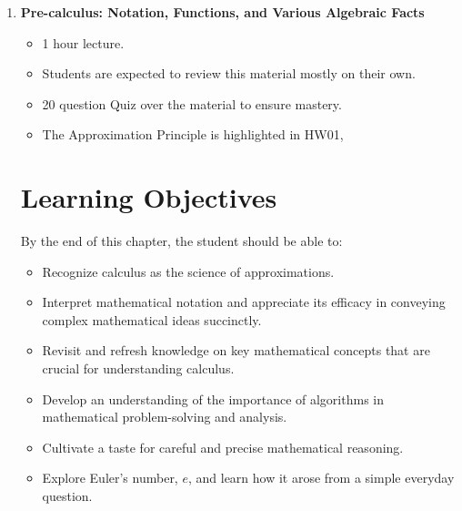 \documentclass[letterpaper]{book}
\begin{document}
\begin{enumerate}[label={\large\arabic*}, font=\large]
    
\item {\Large \bf Pre-calculus: Notation, Functions, and Various Algebraic Facts}
\begin{itemize}
    \item 1 hour lecture.
    \item Students are expected to review this material mostly on their own. 
    \item 20 question Quiz over the material to ensure mastery.
    \item The Approximation Principle is highlighted in HW01,
\end{itemize}
\section*{Learning Objectives}
By the end of this chapter, the student should be able to:
\begin{itemize}
    \item Recognize calculus as the science of approximations.
    \item Interpret mathematical notation and appreciate its efficacy in conveying complex mathematical ideas succinctly.
    \item Revisit and refresh knowledge on key mathematical concepts that are crucial for understanding calculus.
    \item Develop an understanding of the importance of algorithms in mathematical problem-solving and analysis.
    \item Cultivate a taste for careful and precise mathematical reasoning.
    \item Explore Euler's number,  \(e\), and learn how it arose from a simple everyday question.
\end{itemize}


\end{enumerate}
\end{document}
